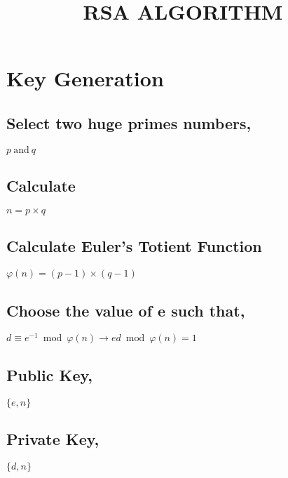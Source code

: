\documentclass[12pt,british]{article}
\author{}
\begin{document}
\title{\textbf{\Huge{}RSA ALGORITHM}}
\maketitle

\section{Key Generation}

\subsection{Select two huge primes numbers,}

$ p \: \text{and} \: q $

\subsection{Calculate}

$ n = p \times q $

\subsection{Calculate Euler's Totient Function}

$ \varphi (n) = (p-1) \times (q-1) $

\subsection{Choose the value of e such that,}

$ d \equiv e^{-1} \bmod \varphi(n) \rightarrow ed \bmod \varphi(n) = 1 $

\subsection{Public Key,}

$ \{e,n\} $

\subsection{Private Key,}

$ \{d,n\} $
\end{document}
